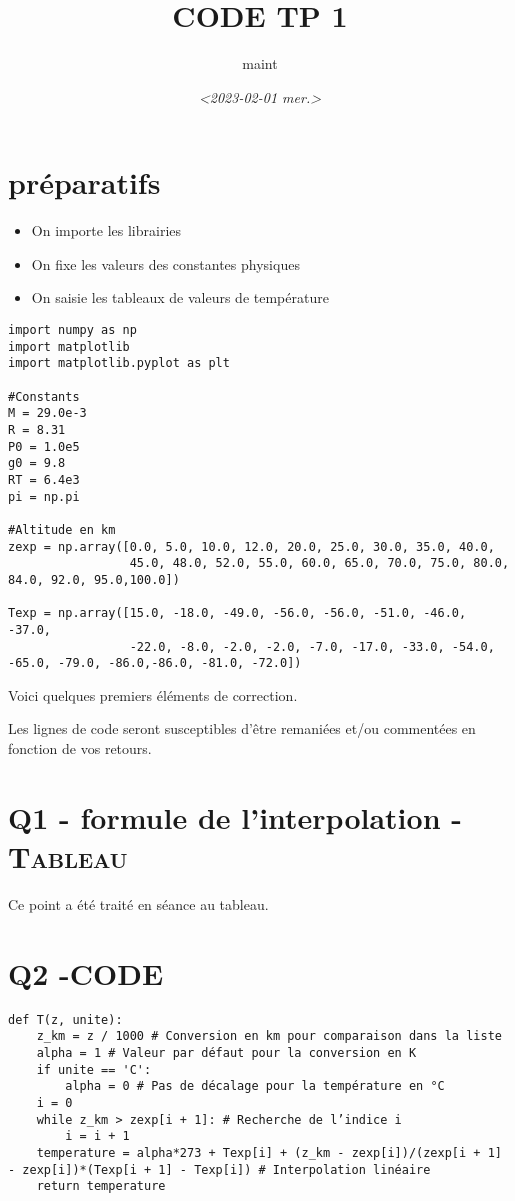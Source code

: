 \documentclass[11pt]{article}
\author{maint}
\date{\textit{<2023-02-01 mer.>}}
\title{CODE TP 1}
\begin{document}
\tableofcontents




\section{préparatifs}
\label{sec:org17dc8c6}

\begin{itemize}
\item On importe les librairies
\item On fixe les valeurs des constantes physiques
\item On saisie les tableaux de valeurs de température
\end{itemize}

\begin{verbatim}
import numpy as np
import matplotlib
import matplotlib.pyplot as plt

#Constants
M = 29.0e-3
R = 8.31
P0 = 1.0e5
g0 = 9.8
RT = 6.4e3
pi = np.pi

#Altitude en km
zexp = np.array([0.0, 5.0, 10.0, 12.0, 20.0, 25.0, 30.0, 35.0, 40.0,
                 45.0, 48.0, 52.0, 55.0, 60.0, 65.0, 70.0, 75.0, 80.0, 84.0, 92.0, 95.0,100.0])

Texp = np.array([15.0, -18.0, -49.0, -56.0, -56.0, -51.0, -46.0, -37.0,
                 -22.0, -8.0, -2.0, -2.0, -7.0, -17.0, -33.0, -54.0, -65.0, -79.0, -86.0,-86.0, -81.0, -72.0])
\end{verbatim}

Voici quelques premiers éléments de correction. 

Les lignes de code seront susceptibles d'être remaniées et/ou commentées en fonction de vos retours.


\section{Q1 - formule de l'interpolation -\hfill{}\textsc{Tableau}}
\label{sec:org12fcaf3}

Ce point a été traité en séance au tableau.

\section{Q2 -\hfill{}\textsc{CODE}}
\label{sec:org0148d29}

\begin{verbatim}
def T(z, unite):
    z_km = z / 1000 # Conversion en km pour comparaison dans la liste
    alpha = 1 # Valeur par défaut pour la conversion en K
    if unite == 'C':
        alpha = 0 # Pas de décalage pour la température en °C
    i = 0
    while z_km > zexp[i + 1]: # Recherche de l’indice i
        i = i + 1
    temperature = alpha*273 + Texp[i] + (z_km - zexp[i])/(zexp[i + 1] - zexp[i])*(Texp[i + 1] - Texp[i]) # Interpolation linéaire
    return temperature
\end{verbatim}
\end{document}

